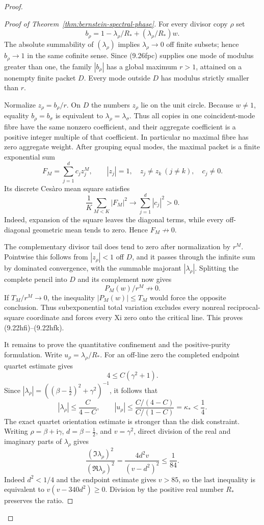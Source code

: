 \documentclass[11pt]{article}
\begin{document}
\begin{proof}
\begin{proof}[Proof of Theorem~\ref{thm:bernstein-spectral-phase}]
For every divisor copy $\rho$ set
\[
 b_\rho=1-\lambda_\rho/R_*+(\lambda_\rho/R_*)w.
\]
The absolute summability of $(\lambda_\rho)$ implies $\lambda_\rho\to0$ off finite subsets;
hence $b_\rho\to1$ in the same cofinite sense.  Since \textup{(9.26fpc)} supplies one mode of
modulus greater than one, the family $|b_\rho|$ has a global maximum $r>1$, attained on a
nonempty finite packet $D$.  Every mode outside $D$ has modulus strictly smaller than $r$.

Normalize $z_\rho=b_\rho/r$.  On $D$ the numbers $z_\rho$ lie on the unit circle.  Because
$w\ne1$, equality $b_\rho=b_\sigma$ is equivalent to
$\lambda_\rho=\lambda_\sigma$.  Thus all copies in one coincident-mode fibre have the same
nonzero coefficient, and their aggregate coefficient is a positive integer multiple of that
coefficient.  In particular no maximal fibre has zero aggregate weight.  After grouping equal
modes, the maximal packet is a finite exponential sum
\[
 F_M=\sum_{j=1}^dc_jz_j^M,
 \qquad |z_j|=1,\quad z_j\ne z_k\ (j\ne k),\quad c_j\ne0.
\]
Its discrete Ces\`aro mean square satisfies
\[
 \frac1K\sum_{M<K}|F_M|^2\longrightarrow\sum_{j=1}^d|c_j|^2>0.
 \tag{9.26fpd}
\]
Indeed, expansion of the square leaves the diagonal terms, while every off-diagonal geometric
mean tends to zero.  Hence $F_M\not\to0$.

The complementary divisor tail does tend to zero after normalization by $r^M$.  Pointwise this
follows from $|z_\rho|<1$ off $D$, and it passes through the infinite sum by dominated
convergence, with the summable majorant $|\lambda_\rho|$.  Splitting the complete pencil into
$D$ and its complement now gives
\[
 P_M(w)/r^M\not\longrightarrow0.
\]
If $T_M/r^M\to0$, the inequality $|P_M(w)|\le T_M$ would force the opposite conclusion.  Thus
subexponential total variation excludes every nonreal reciprocal-square coordinate and forces
every Xi zero onto the critical line.  This proves \textup{(9.22hfi)}--\textup{(9.22hfk)}.

It remains to prove the quantitative confinement and the positive-purity formulation.  Write
$u_\rho=\lambda_\rho/R_*$.  For an off-line zero the completed endpoint quartet estimate gives
\[
 4\le C(\gamma^2+1).
\]
Since $|\lambda_\rho|=((\beta-\tfrac12)^2+\gamma^2)^{-1}$, it follows that
\[
 |\lambda_\rho|\le\frac{C}{4-C},
 \qquad
 |u_\rho|\le
 \frac{C/(4-C)}{C/(1-C)}
 =\kappa_*<\frac14.
 \tag{9.26fpe}
\]
The exact quartet orientation estimate is stronger than the disk constraint.  Writing
$\rho=\beta+\mathrm i\gamma$, $d=\beta-\tfrac12$, and $v=\gamma^2$, direct division of the
real and imaginary parts of $\lambda_\rho$ gives
\[
 \frac{(\Im\lambda_\rho)^2}{(\Re\lambda_\rho)^2}
 =\frac{4d^2v}{(v-d^2)^2}\le\frac1{84}.
 \tag{9.26fpf}
\]
Indeed $d^2<1/4$ and the endpoint estimate gives $v>85$, so the last inequality is equivalent
to $v(v-340d^2)\ge0$.  Division by the positive real number $R_*$ preserves the ratio.


\end{proof}
\end{proof}
\end{document}
